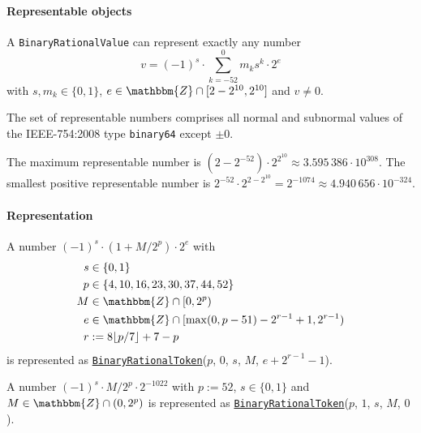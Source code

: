 \documentclass{dbor-article}
\newcommand{\SetOfIntegers}{\mathbbm{Z}}
\newcommand{\DborSyntaxIdent}[1]{\texttt{#1}}
\newcommand{\DborSyntaxIdentRef}[1]{\hyperlink{sec:def:#1}{\DborSyntaxIdent{#1}}}
\begin{document}
    \paragraph{Representable objects}

    A \DborSyntaxIdent{BinaryRationalValue} can represent exactly any number
    \begin{equation}
        v = (-1)^s \cdot \sum_{k = -52}^0 m_k s^k \cdot 2^e
    \end{equation}
    with $s, m_k \in \{0, 1\}$, $e \in \SetOfIntegers \cap [2 - 2^{10}, 2^{10}]$ and $v \ne 0$.

    The set of representable numbers comprises all normal and subnormal values of the IEEE-754:2008 type
    \texttt{binary64} except $\pm 0$.

    \smallskip
    The maximum representable number is $(2 - 2^{-52}) \cdot 2^{2^{10}} \approx 3.595\,386 \cdot 10^{308}$.
    The smallest positive representable number is $2^{-52} \cdot 2^{2-2^{10}} = 2^{-1074}
    \approx 4.940\,656 \cdot 10^{-324}$.

    \paragraph{Representation}

    A number $(-1)^s \cdot (1 + M/2^p) \cdot 2^e$ with
    \begin{align*}
        s & \in \{0, 1\} \\
        p & \in \{4, 10, 16, 23, 30, 37, 44, 52\} \\
        M & \in \SetOfIntegers \cap [0, 2^p) \\
        e & \in \SetOfIntegers \cap [\max(0, p - 51) - 2^{r - 1} + 1, 2^{r - 1}) \\
        r & := 8 \lfloor p / 7 \rfloor + 7 - p
    \end{align*}%
    is represented as
    \DborSyntaxIdentRef{BinaryRationalToken}($p$, $0$, $s$, $M$, $e + 2^{r - 1} - 1$).

    A number $(-1)^s \cdot M/2^p \cdot 2^{-1022}$ with $p := 52$, $s \in \{0, 1\}$ and
    $M \in \SetOfIntegers \cap (0, 2^p)$ is represented as
    \DborSyntaxIdentRef{BinaryRationalToken}($p$, $1$, $s$, $M$, $0$).
\end{document}
